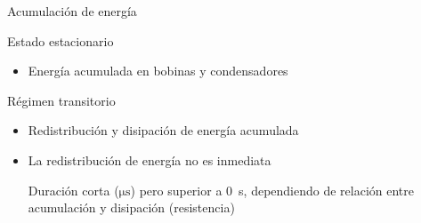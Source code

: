 \documentclass[aspectratio=169, usenames,svgnames,dvipsnames]{beamer}
\begin{document}

\begin{frame}{Acumulación de energía}
    \begin{block}{Estado estacionario}
        \begin{itemize}
            \vspace{1mm}
            \item \alert{Energía acumulada} en \alert{bobinas} y \alert{condensadores}
            
            \vspace{1mm}
        \end{itemize}
    \end{block}

    \vspace{4mm}
    \begin{block}{Régimen transitorio}
        \begin{itemize}
            \vspace{1mm}
            \item \alert{Redistribución} y \alert{disipación} de energía acumulada

            \vspace{1mm}
            \item La redistribución de energía \alert{no} es \alert{inmediata}

            \vspace{1mm}
            \alert{Duración corta} (\(\si{\micro\second}\)) pero superior a \qty{0}{\second}, dependiendo de \alert{relación entre} \alert{acumulación} y \alert{disipación} (resistencia)

            \vspace{1mm}
        \end{itemize}
    \end{block}
\end{frame}

\end{document}
